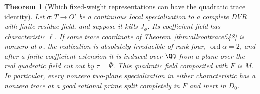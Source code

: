 \documentclass[a4paper,11pt]{article}
\newtheorem{theorem}[proposition]{Theorem}
\theoremstyle{definition}
\theoremstyle{remark}
\numberwithin{equation}{section}
\begin{document}
\begin{theorem}[Which fixed-weight representations can have the quadratic trace identity]
\leavevmode\label{thm:rationalinduction585}
Let \(\sigma:T\to O'\) be a continuous local specialization to a
complete DVR with finite residue field, and suppose it kills
\(J_\phi\). Its coefficient field has characteristic \(\ell\).
If some trace coordinate of Theorem~\ref{thm:allroottrace548}
is nonzero at \(\sigma\), the realization is absolutely
irreducible of rank four, \(\operatorname{ord}\alpha=2\), and
after a finite coefficient extension it is induced over
\(\QQ\) from a plane over the real quadratic field cut out by
\(\tau=\bar\Psi\). This quadratic field composited with \(F\)
is \(M\). In particular, every nonzero two-plane specialization
in either characteristic has a nonzero trace at a good rational
prime split completely in \(F\) and inert in \(D_0\).
\end{theorem}
\end{document}
